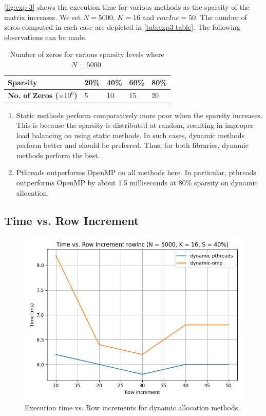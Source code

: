 \documentclass[conference,compsoc]{IEEEtran}
\begin{document}
\autoref{fig:exp-3} shows the execution time for various methods as the sparsity
of the matrix increases. We set \(N = 5000\), \(K = 16\) and \(rowInc = 50\).
The number of zeros computed in each case are depicted in
\autoref{tab:exp3-table}. The following observations can be made.

\begin{table}[!ht]
    \begin{tabularx}{\columnwidth}{|Y|Y|Y|Y|Y|}
        \hline
        \textbf{Sparsity} & 20\% & 40\% & 60\% & 80\% \\
        \hline
        \textbf{No. of Zeros (\(\times 10^6\))} & 5 & 10 & 15 & 20 \\
        \hline
    \end{tabularx}
    \caption{Number of zeros for various sparsity levels where \(N = 5000\).}
    \label{tab:exp3-table}
\end{table}

\begin{enumerate}
    \item Static methods perform comparatively more poor when the sparsity
    increases. This is because the sparsity is distributed at random, resulting
    in improper load balancing on using static methods. In such cases, dynamic
    methods perform better and should be preferred. Thus, for both libraries,
    dynamic methods perform the best.
    \item Pthreads outperforms OpenMP on all methods here. In particular,
    pthreads outperforms OpenMP by about 1.5 milliseconds at 80\% sparsity on
    dynamic allocation.
\end{enumerate}

\subsection{Time vs. Row Increment}
\label{subsec:exp4}

\begin{figure}[!ht]
    \includegraphics[width=\columnwidth]{images/exp4.png}
    \caption{Execution time vs. Row increments for dynamic allocation methods.}
    \label{fig:exp-4}
\end{figure}
\end{document}
